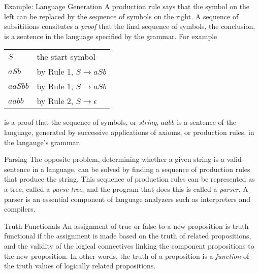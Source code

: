 \documentclass[smaller]{beamer}
\begin{document}
\begin{frame}[label={sec:orge9d1c04}]{Example: Language Generation}
A production rule says that the symbol on the left can be replaced by the sequence of symbols on the right.  A sequence of subsititions consitutes a \emph{proof} that the final sequence of symbols, the conclusion, is a sentence in the language specified by the grammar.  For example


\begin{center}
\begin{tabular}{ll}
\(S\) & the start symbol\\
\(aSb\) & by Rule 1, \(S \rightarrow aSb\)\\
\(aaSbb\) & by Rule 1, \(S \rightarrow aSb\)\\
\(aabb\) & by Rule 2, \(S \rightarrow \epsilon\)\\
\end{tabular}
\end{center}

is a proof that the sequence of symbols, or \emph{string}, \(aabb\) is a sentence of the language, generated by successive applications of axioms, or production rules, in the langauge's grammar.

\begin{alertblock}{Parsing}
The opposite problem, determining whether a given string is a valid sentence in a language, can be solved by finding a sequence of production rules that produce the string.  This sequence of production rules can be represented as a tree, called a \emph{parse tree}, and the program that does this is called a \emph{parser}.  A parser is an essential component of language analyzers such as interpreters and compilers.
\end{alertblock}
\end{frame}

\begin{frame}[label={sec:org0eec51d}]{Truth Functionals}
An assignment of true or false to a new proposition is \alert{truth functional} if the assignment is made based on the truth of related propositions, and the validity of the logical connectives linking the component propositions to the new proposition.  In other words, the truth of a proposition is a \emph{function} of the truth values of logically related propositions.
\end{frame}
\end{document}
